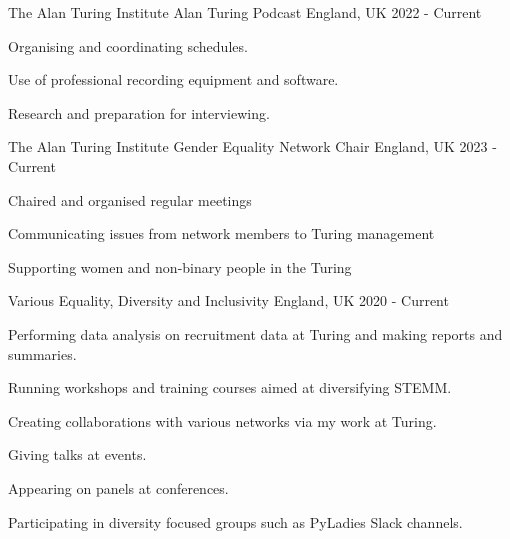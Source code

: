 



\begin{cventries}
  \cventry
    {The Alan Turing Institute}
    {Alan Turing Podcast} %
    {England, UK}
    {2022 - Current}
    { \begin{cvitems} %
        \item {Organising and coordinating schedules.}
        \item {Use of professional recording equipment and software.}
        \item {Research and preparation for interviewing.}
      \end{cvitems}} %

    \cventry
      {The Alan Turing Institute}
      {Gender Equality Network Chair} %
      {England, UK}
      {2023 - Current}
      { \begin{cvitems} %
          \item {Chaired and organised regular meetings}
          \item {Communicating issues from network members to Turing management}
          \item {Supporting women and non-binary people in the Turing}
        \end{cvitems}} %

  \cventry
    {Various}
    {Equality, Diversity and Inclusivity} %
    {England, UK}
    {2020 - Current}
    {
    \begin{cvitems} %
        \item {Performing data analysis on recruitment data at Turing and making reports and summaries.}
        \item {Running workshops and training courses aimed at diversifying STEMM.}
        \item {Creating collaborations with various networks via my work at Turing.}
        \item {Giving talks at events.}
        \item {Appearing on panels at conferences.}
        \item {Participating in diversity focused groups such as PyLadies Slack channels.}
      \end{cvitems} } %
    

\end{cventries}
